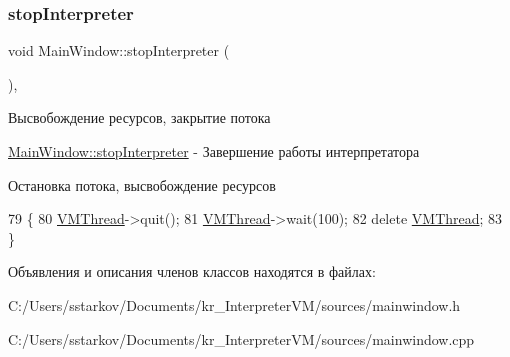 \subsubsection{\texorpdfstring{stop\+Interpreter}{stopInterpreter}}
{\footnotesize\ttfamily void Main\+Window\+::stop\+Interpreter (\begin{DoxyParamCaption}{ }\end{DoxyParamCaption})\hspace{0.3cm}{\ttfamily [private]}, {\ttfamily [slot]}}



Высвобождение ресурсов, закрытие потока 

\hyperlink{class_main_window_a123b5275e6bb8411973a2f2be7b8b45f}{Main\+Window\+::stop\+Interpreter} -\/ Завершение работы интерпретатора

Остановка потока, высвобождение ресурсов 
\begin{DoxyCode}
79 \{
80     \hyperlink{class_main_window_aa16438ee9c972be8c7231f2d376dafb7}{VMThread}->quit();
81     \hyperlink{class_main_window_aa16438ee9c972be8c7231f2d376dafb7}{VMThread}->wait(100);
82     \textcolor{keyword}{delete} \hyperlink{class_main_window_aa16438ee9c972be8c7231f2d376dafb7}{VMThread};
83 \}
\end{DoxyCode}


Объявления и описания членов классов находятся в файлах\+:\begin{DoxyCompactItemize}
\item 
C\+:/\+Users/sstarkov/\+Documents/kr\+\_\+\+Interpreter\+V\+M/sources/mainwindow.\+h\item 
C\+:/\+Users/sstarkov/\+Documents/kr\+\_\+\+Interpreter\+V\+M/sources/mainwindow.\+cpp\end{DoxyCompactItemize}
